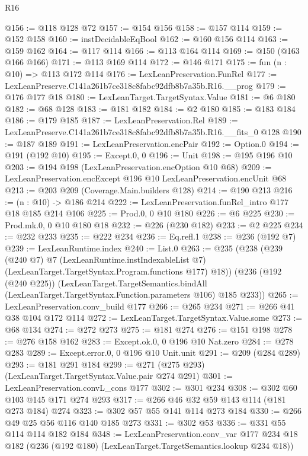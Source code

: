 \begin{lexlean}{R16}
\begin{coremodule}
@156 := @118 @128 @72
@157 := @154 @156
@158 := @157 @114
@159 := @152 @158
@160 := instDecidableEqBool
@162 := @160 @156 @114
@163 := @159 @162
@164 := @117 @114
@166 := @113 @164 @114
@169 := @150 (@163 @166 @166)
@171 := @113 @169 @114
@172 := @146 @171
@175 := fun (n : @10) => @113 @172 @114
@176 := LexLeanPreservation.FunRel
@177 := LexLeanPreserve.C141a261b7ce318c8fabc92dfb8b7a35b.R16.__prog
@179 := @176 @177 @18
@180 := LexLeanTarget.TargetSyntax.Value
@181 := @6 @180
@182 := @68 @128
@183 := @181 @182
@184 := @2 @180
@185 := @183 @184
@186 := @179 @185
@187 := LexLeanPreservation.Rel
@189 := LexLeanPreserve.C141a261b7ce318c8fabc92dfb8b7a35b.R16.__fits_0 @128
@190 := @187 @189
@191 := LexLeanPreservation.encPair
@192 := Option.{0}
@194 := @191 (@192 @10)
@195 := Except.{0, 0}
@196 := Unit
@198 := @195 @196 @10
@203 := @194 @198 (LexLeanPreservation.encOption @10 @68)
@209 := LexLeanPreservation.encExcept @196 @10 LexLeanPreservation.encUnit @68
@213 := @203 @209 (Coverage.Main.builders @128)
@214 := @190 @213
@216 := (n : @10) -> @186 @214
@222 := LexLeanPreservation.funRel_intro @177 @18 @185 @214 @106
@225 := Prod.{0, 0} @10 @180
@226 := @6 @225
@230 := Prod.mk.{0, 0} @10 @180 @18
@232 := @226 (@230 @182)
@233 := @2 @225
@234 := @232 @233
@235 := @222 @234
@236 := Eq.refl.{1}
@238 := @236 (@192 @7)
@239 := LexLeanRuntime.index
@240 := List.{0}
@263 := @235
    (@238
      (@239
        (@240 @7)
        @7
        (LexLeanRuntime.instIndexableList @7)
        (LexLeanTarget.TargetSyntax.Program.functions @177)
        @18))
    (@236
      (@192 (@240 @225))
      (LexLeanTarget.TargetSemantics.bindAll
        (LexLeanTarget.TargetSyntax.Function.parameters @106)
        @185
        @233))
@265 := LexLeanPreservation.conv_build @177
@266 := @265 @234
@271 := @266 @41 @38 @104 @172 @114
@272 := LexLeanTarget.TargetSyntax.Value.some
@273 := @68 @134
@274 := @272 @273
@275 := @181 @274
@276 := @151 @198
@278 := @276 @158 @162
@283 := Except.ok.{0, 0} @196 @10 Nat.zero
@284 := @278 @283
@289 := Except.error.{0, 0} @196 @10 Unit.unit
@291 := @209 (@284 @289)
@293 := @181 @291 @184
@299 := @271 (@275 @293) (LexLeanTarget.TargetSyntax.Value.pair @274 @291)
@301 := LexLeanPreservation.convL_cons @177
@302 := @301 @234
@308 := @302 @60 @103 @145 @171 @274 @293
@317 := @266 @46 @32 @59 @143 @114 (@181 @273 @184) @274
@323 := @302 @57 @55 @141 @114 @273 @184
@330 := @266 @49 @25 @56 @116 @140 @185 @273
@331 := @302 @53
@336 := @331 @55 @114 @114 @182 @184
@348 := LexLeanPreservation.conv_var
    @177
    @234
    @18
    @182
    (@236 (@192 @180) (LexLeanTarget.TargetSemantics.lookup @234 @18))

\end{coremodule}
\end{lexlean}
